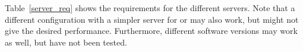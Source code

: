 Table~\ref{server_req} shows the requirements for the different servers. Note that a different configuration with a simpler server for \oapoc{} or \omfraf{} may also work, but might not give the desired performance. Furthermore, different software versions may work as well, but have not been tested.
